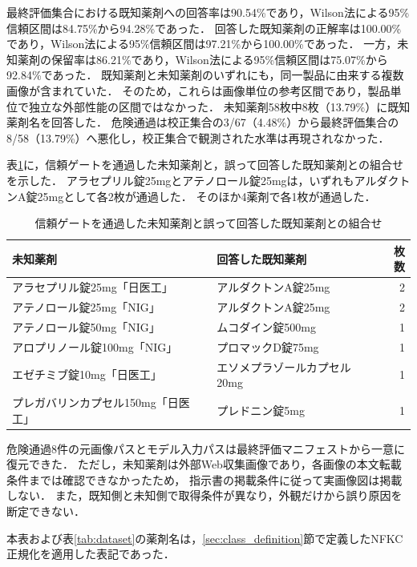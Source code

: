\documentclass[uplatex,dvipdfmx]{jsarticle}
\begin{document}
最終評価集合における既知薬剤への回答率は90.54\%であり，Wilson法による95\%信頼区間は84.75\%から94.28\%であった．
回答した既知薬剤の正解率は100.00\%であり，Wilson法による95\%信頼区間は97.21\%から100.00\%であった．
一方，未知薬剤の保留率は86.21\%であり，Wilson法による95\%信頼区間は75.07\%から92.84\%であった．
既知薬剤と未知薬剤のいずれにも，同一製品に由来する複数画像が含まれていた．
そのため，これらは画像単位の参考区間であり，製品単位で独立な外部性能の区間ではなかった．
未知薬剤58枚中8枚（13.79\%）に既知薬剤名を回答した．
危険通過は校正集合の3/67（4.48\%）から最終評価集合の8/58（13.79\%）へ悪化し，校正集合で観測された水準は再現されなかった．

表\ref{tab:trust_gate_unsafe}に，信頼ゲートを通過した未知薬剤と，誤って回答した既知薬剤との組合せを示した．
アラセプリル錠25mgとアテノロール錠25mgは，いずれもアルダクトンA錠25mgとして各2枚が通過した．
そのほか4薬剤で各1枚が通過した．

\begin{table}[H]
  \centering
  \caption{信頼ゲートを通過した未知薬剤と誤って回答した既知薬剤との組合せ}
  \label{tab:trust_gate_unsafe}
  \small
  \begin{tabular}{|p{5.0cm}|p{5.0cm}|r|}
    \hline
    未知薬剤 & 回答した既知薬剤 & 枚数 \\ \hline
    アラセプリル錠25mg「日医工」 & アルダクトンA錠25mg & 2 \\ \hline
    アテノロール錠25mg「NIG」 & アルダクトンA錠25mg & 2 \\ \hline
    アテノロール錠50mg「NIG」 & ムコダイン錠500mg & 1 \\ \hline
    アロプリノール錠100mg「NIG」 & プロマックD錠75mg & 1 \\ \hline
    エゼチミブ錠10mg「日医工」 & エソメプラゾールカプセル20mg & 1 \\ \hline
    プレガバリンカプセル150mg「日医工」 & プレドニン錠5mg & 1 \\ \hline
  \end{tabular}
\end{table}

危険通過8件の元画像パスとモデル入力パスは最終評価マニフェストから一意に復元できた．
ただし，未知薬剤は外部Web収集画像であり，各画像の本文転載条件までは確認できなかったため，
指示書の掲載条件に従って実画像図は掲載しない．
また，既知側と未知側で取得条件が異なり，外観だけから誤り原因を断定できない．

本表および表\ref{tab:dataset}の薬剤名は，\ref{sec:class_definition}節で定義したNFKC正規化を適用した表記であった．
\end{document}
